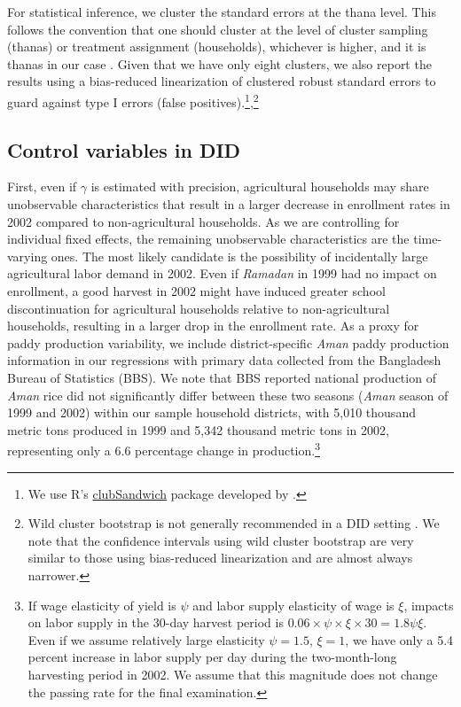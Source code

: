 \documentclass[12pt,letterpaper]{article}
\newcommand{\0}{\ensuremath{\mbox{\boldmath $0$}}}
\begin{document}
For statistical inference, we cluster the standard errors at the thana level. This follows the convention that one should cluster at the level of cluster sampling (thanas) or treatment assignment (households), whichever is higher, and it is thanas in our case \citep{abadie2023should}. 
Given that we have only eight clusters, we also report the results using a bias-reduced linearization \citep[Satterthwaite correction, see][]{BellMcCaffrey2002, ImbensKolesar2016, PustejovskyTipton2018} of clustered robust standard errors to guard against type I errors (false positives).\footnote{We use R's \href{https://cran.r-project.org/web/packages/clubSandwich/vignettes/panel-data-CRVE.html}{\textsf{clubSandwich}} package developed by \citet{PustejovskyTipton2018}.},\footnote{Wild cluster bootstrap is not generally recommended in a DID setting \citep{CanaySantosShaikh2021}. We note that the confidence intervals using wild cluster bootstrap are very similar to those using bias-reduced linearization and are almost always narrower.\label{fnWCB}} 


\subsection{Control variables in DID}

First, even if $\gamma$ is estimated with precision, agricultural households may share unobservable characteristics that result in a larger decrease in enrollment rates in 2002 compared to non-agricultural households. As we are controlling for individual fixed effects, the remaining unobservable characteristics are the time-varying ones. The most likely candidate is the possibility of incidentally large agricultural labor demand in 2002. Even if \textit{Ramadan} in 1999 had no impact on enrollment, a good harvest in 2002 might have induced greater school discontinuation for agricultural households relative to non-agricultural households, resulting in a larger drop in the enrollment rate. As a proxy for paddy production variability, we include district-specific \textit{Aman} paddy production information in our regressions with primary data collected from the Bangladesh Bureau of Statistics (BBS). We note that BBS reported national production of \textit{Aman} rice did not significantly differ between these two seasons (\textit{Aman} season of 1999 and 2002) within our sample household districts, with 5,010 thousand metric tons produced in 1999 and 5,342 thousand metric tons in 2002, representing only a 6.6 percentage change in production.\footnote{If wage elasticity of yield is $\psi$ and labor supply elasticity of wage is $\xi$, impacts on labor supply in the 30-day harvest period is $0.06\times\psi\times\xi\times 30 = 1.8\psi\xi$. Even if we assume relatively large elasticity $\psi = 1.5$, $\xi=1$, we have only a 5.4 percent increase in labor supply per day during the two-month-long harvesting period in 2002. We assume that this magnitude does not change the passing rate for the final examination.} 
\end{document}

